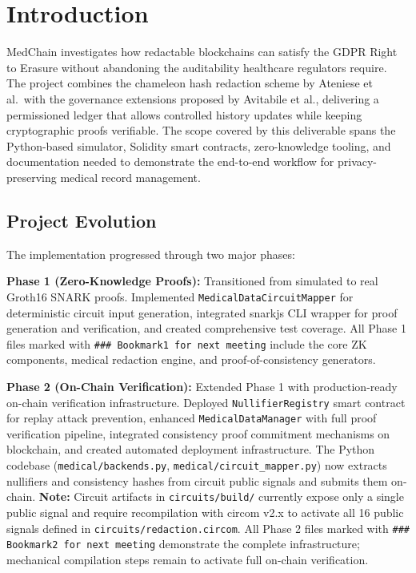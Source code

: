 \section{Introduction}

MedChain investigates how redactable blockchains can satisfy the GDPR Right to Erasure without abandoning the auditability healthcare regulators require. The project combines the chameleon hash redaction scheme by Ateniese et al.\ with the governance extensions proposed by Avitabile et al., delivering a permissioned ledger that allows controlled history updates while keeping cryptographic proofs verifiable. The scope covered by this deliverable spans the Python-based simulator, Solidity smart contracts, zero-knowledge tooling, and documentation needed to demonstrate the end-to-end workflow for privacy-preserving medical record management.

\subsection{Project Evolution}

The implementation progressed through two major phases:

\textbf{Phase 1 (Zero-Knowledge Proofs):} Transitioned from simulated to real Groth16 SNARK proofs. Implemented \texttt{MedicalDataCircuitMapper} for deterministic circuit input generation, integrated snarkjs CLI wrapper for proof generation and verification, and created comprehensive test coverage. All Phase 1 files marked with \texttt{\#\#\# Bookmark1 for next meeting} include the core ZK components, medical redaction engine, and proof-of-consistency generators.

\textbf{Phase 2 (On-Chain Verification):} Extended Phase 1 with production-ready on-chain verification infrastructure. Deployed \texttt{NullifierRegistry} smart contract for replay attack prevention, enhanced \texttt{MedicalDataManager} with full proof verification pipeline, integrated consistency proof commitment mechanisms on blockchain, and created automated deployment infrastructure. The Python codebase (\texttt{medical/backends.py}, \texttt{medical/circuit\_mapper.py}) now extracts nullifiers and consistency hashes from circuit public signals and submits them on-chain. \textbf{Note:} Circuit artifacts in \texttt{circuits/build/} currently expose only a single public signal and require recompilation with circom v2.x to activate all 16 public signals defined in \texttt{circuits/redaction.circom}. All Phase 2 files marked with \texttt{\#\#\# Bookmark2 for next meeting} demonstrate the complete infrastructure; mechanical compilation steps remain to activate full on-chain verification.


